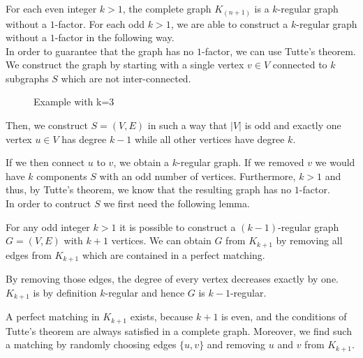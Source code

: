 \documentclass[a4paper]{article}
\begin{document}
	\newpage
	\begin{solution}{11}
		For each even integer $k > 1$, the complete graph $K_{(n+1)}$ is a $k$-regular graph without a $1$-factor. 
		For each odd $k > 1$, we are able to construct a $k$-regular graph without a $1$-factor in the following way. \\
		
		In order to guarantee that the graph has no $1$-factor, we can use Tutte's theorem. We construct the graph by starting with a single vertex $v \in V$ connected to $k$ subgraphs $S$ which are not inter-connected. 
		\begin{figure}[h]
			\centering
		\caption{Example with k=3}
		\end{figure}
		Then, we construct $S=(V,E)$ in such a way that $|V|$ is odd and exactly one vertex $u \in V$ has degree $k-1$ while all other vertices have degree $k$.
 
		If we then connect $u$ to $v$, we obtain a $k$-regular graph. If we removed $v$ we would have $k$ components $S$ with an odd number of vertices. Furthermore, $k > 1$ and thus, by Tutte's theorem, we know that the resulting graph has no $1$-factor.\\
		
		In order to contruct $S$ we first need the following lemma.
		\begin{lemma}{For any odd integer $k > 1$ it is possible to construct a $(k-1)$-regular graph $G=(V,E)$ with $k+1$ vertices.}
			We can obtain $G$ from $K_{k+1}$ by removing all edges from $K_{k+1}$ which are contained in a perfect matching. 

			By removing those edges, the degree of every vertex decreases exactly by one. $K_{k+1}$ is by definition $k$-regular and hence $G$ is $k-1$-regular.

			A perfect matching in $K_{k+1}$ exists, because $k+1$ is even, and the conditions of Tutte's theorem are always satisfied in a complete graph. Moreover, we find such a matching by randomly choosing edges $\{u,v\}$ and removing $u$ and $v$ from $K_{k+1}$. 
		\end{lemma}
		

\end{solution}
\end{document}
